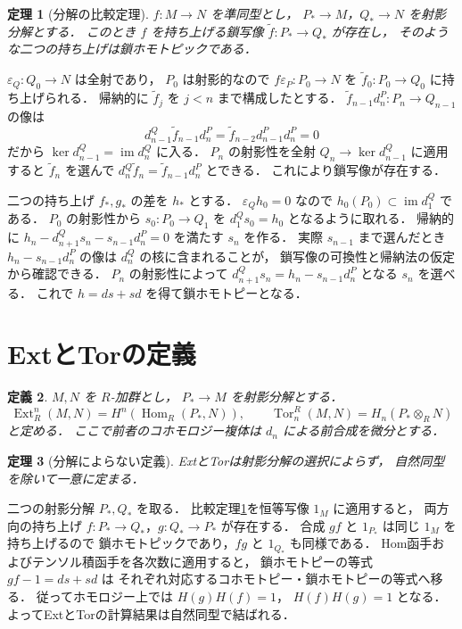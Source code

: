 \documentclass[a5paper,10pt,onecolumn]{jsarticle}
\makeatletter
\theoremstyle{mathnotetheorem}
\newtheorem{theorem}{定理}[section]
\newtheorem{definition}[theorem]{定義}
\renewcommand{\proofname}{証明}
\renewenvironment{proof}[1][\proofname]{%
  \par\pushQED{\qed}\normalfont\topsep4\p@\@plus2\p@\relax
  \trivlist\item[\hskip\labelsep\bfseries #1]\ignorespaces
}{\popQED\endtrivlist\@endpefalse}
\makeatother
\begin{document}
\begin{theorem}[分解の比較定理]\label{thm:comparison}
$f:M\to N$ を準同型とし，
$P_*\to M$，$Q_*\to N$ を射影分解とする．
このとき $f$ を持ち上げる鎖写像
$\widetilde f:P_*\to Q_*$ が存在し，
そのような二つの持ち上げは鎖ホモトピックである．
\end{theorem}
\begin{proof}
$\varepsilon_Q:Q_0\to N$ は全射であり，
$P_0$ は射影的なので
$f\varepsilon_P:P_0\to N$ を
$\widetilde f_0:P_0\to Q_0$ に持ち上げられる．
帰納的に $\widetilde f_j$ を $j<n$ まで構成したとする．
$\widetilde f_{n-1}d^P_n:P_n\to Q_{n-1}$ の像は
\[
 d^Q_{n-1}\widetilde f_{n-1}d^P_n
 =\widetilde f_{n-2}d^P_{n-1}d^P_n=0
\]
だから $\ker d^Q_{n-1}=\operatorname{im}d^Q_n$ に入る．
$P_n$ の射影性を全射
$Q_n\to\ker d^Q_{n-1}$ に適用すると
$\widetilde f_n$ を選んで
$d^Q_n\widetilde f_n=\widetilde f_{n-1}d^P_n$
とできる．
これにより鎖写像が存在する．

二つの持ち上げ $f_*,g_*$ の差を $h_*$ とする．
$\varepsilon_Qh_0=0$ なので
$h_0(P_0)\subset\operatorname{im}d^Q_1$ である．
$P_0$ の射影性から
$s_0:P_0\to Q_1$ を
$d^Q_1s_0=h_0$ となるように取れる．
帰納的に
$h_n-d^Q_{n+1}s_n-s_{n-1}d^P_n=0$
を満たす $s_n$ を作る．
実際 $s_{n-1}$ まで選んだとき
$h_n-s_{n-1}d^P_n$ の像は
$d^Q_n$ の核に含まれることが，
鎖写像の可換性と帰納法の仮定から確認できる．
$P_n$ の射影性によって
$d^Q_{n+1}s_n=h_n-s_{n-1}d^P_n$ となる
$s_n$ を選べる．
これで $h=ds+sd$ を得て鎖ホモトピーとなる．
\end{proof}

\section{ExtとTorの定義}

\begin{definition}
$M,N$ を $R$-加群とし，
$P_*\to M$ を射影分解とする．
\[
 \operatorname{Ext}_R^n(M,N)
 =H^n(\operatorname{Hom}_R(P_*,N)),\qquad
 \operatorname{Tor}^R_n(M,N)
 =H_n(P_*\otimes_R N)
\]
と定める．
ここで前者のコホモロジー複体は
$d_n$ による前合成を微分とする．
\end{definition}

\begin{theorem}[分解によらない定義]\label{thm:derived-wd}
ExtとTorは射影分解の選択によらず，
自然同型を除いて一意に定まる．
\end{theorem}
\begin{proof}
二つの射影分解 $P_*,Q_*$ を取る．
比較定理\ref{thm:comparison}を恒等写像 $1_M$ に適用すると，
両方向の持ち上げ
$f:P_*\to Q_*$，$g:Q_*\to P_*$ が存在する．
合成 $gf$ と $1_{P_*}$ は同じ $1_M$ を持ち上げるので
鎖ホモトピックであり，$fg$ と $1_{Q_*}$ も同様である．
Hom函手およびテンソル積函手を各次数に適用すると，
鎖ホモトピーの等式 $gf-1=ds+sd$ は
それぞれ対応するコホモトピー・鎖ホモトピーの等式へ移る．
従ってホモロジー上では $H(g)H(f)=1$，
$H(f)H(g)=1$ となる．
よってExtとTorの計算結果は自然同型で結ばれる．
\end{proof}
\end{document}
